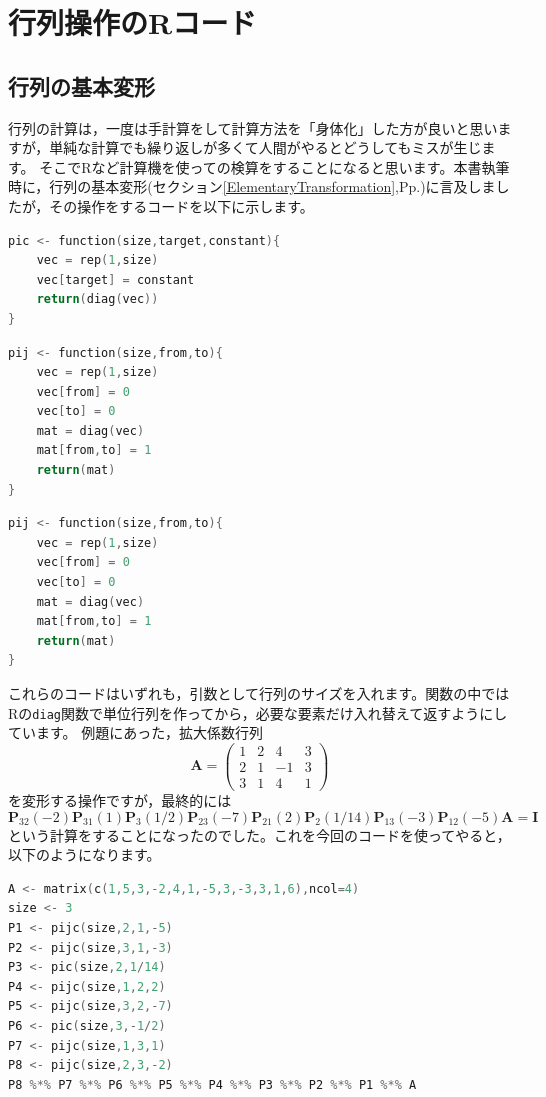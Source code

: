 \documentclass{ltjsbook}
\begin{document}
\chapter{行列操作のRコード}
\label{LA_R}
\section{行列の基本変形}
行列の計算は，一度は手計算をして計算方法を「身体化」した方が良いと思いますが，単純な計算でも繰り返しが多くて人間がやるとどうしてもミスが生じます。
そこでRなど計算機を使っての検算をすることになると思います。本書執筆時に，行列の基本変形(セクション\ref{ElementaryTransformation},Pp.\pageref{ElementaryTransformation})に言及しましたが，その操作をするコードを以下に示します。

\begin{lstlisting}[language=C++,label={Pic},caption={ある行に0ではない数字を掛ける}]
pic <- function(size,target,constant){
    vec = rep(1,size)
    vec[target] = constant
    return(diag(vec))
}
\end{lstlisting}

\begin{lstlisting}[language=C++,label={Pijc},caption={ある行に他の行を何倍かしたものを加える}]
pij <- function(size,from,to){
    vec = rep(1,size)
    vec[from] = 0
    vec[to] = 0
    mat = diag(vec)
    mat[from,to] = 1
    return(mat)
}
\end{lstlisting}

\begin{lstlisting}[language=C++,label={Pij},caption={2つの行を入れ替える}]
pij <- function(size,from,to){
    vec = rep(1,size)
    vec[from] = 0
    vec[to] = 0
    mat = diag(vec)
    mat[from,to] = 1
    return(mat)
}
\end{lstlisting}

これらのコードはいずれも，引数として行列のサイズを入れます。関数の中ではRの\verb|diag|関数で単位行列を作ってから，必要な要素だけ入れ替えて返すようにしています。
例題にあった，拡大係数行列
\[ \bm{A} = \begin{pmatrix} 1&2&4&3\\2&1&-1&3\\3&1&4&1\end{pmatrix} \]
を変形する操作ですが，最終的には
\[ \bm{P}_{32}(-2)\bm{P}_{31}(1)\bm{P}_{3}(1/2)\bm{P}_{23}(-7)\bm{P}_{21}(2)\bm{P}_{2}(1/14)\bm{P}_{13}(-3)\bm{P}_{12}(-5)\bm{A} = \bm{I} \]
という計算をすることになったのでした。これを今回のコードを使ってやると，以下のようになります。
\begin{lstlisting}[language=C++,label={P},caption={拡大係数行列の変形}]
A <- matrix(c(1,5,3,-2,4,1,-5,3,-3,3,1,6),ncol=4)
size <- 3
P1 <- pijc(size,2,1,-5)
P2 <- pijc(size,3,1,-3)
P3 <- pic(size,2,1/14)
P4 <- pijc(size,1,2,2)
P5 <- pijc(size,3,2,-7)
P6 <- pic(size,3,-1/2)
P7 <- pijc(size,1,3,1)
P8 <- pijc(size,2,3,-2)
P8 %*% P7 %*% P6 %*% P5 %*% P4 %*% P3 %*% P2 %*% P1 %*% A
\end{lstlisting}
\end{document}
